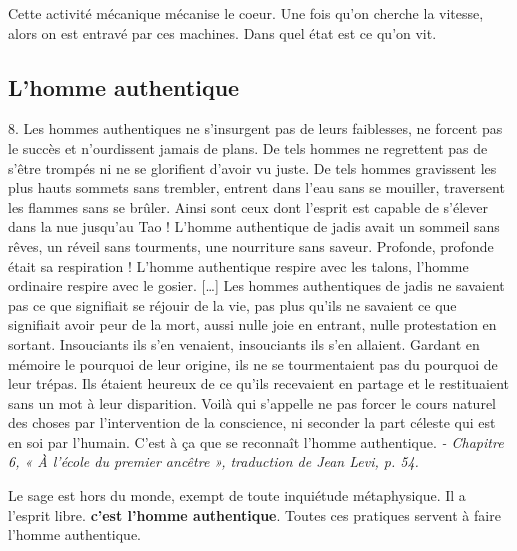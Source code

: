     Cette activité mécanique mécanise le coeur. Une fois qu'on cherche la vitesse, alors on est entravé par ces machines. Dans quel état est ce qu'on vit. 

\subsection{L'homme authentique}
    
  \begin{singlequote}
      8. Les hommes authentiques ne s’insurgent pas de leurs faiblesses, ne forcent pas le succès et  n’ourdissent jamais de plans.          De tels hommes ne regrettent pas de s’être trompés ni ne se glorifient d’avoir vu juste. De tels hommes gravissent les plus hauts sommets sans trembler, entrent dans l’eau sans se mouiller, traversent les flammes sans se brûler. Ainsi sont ceux dont l’esprit est capable de s’élever dans la nue jusqu’au Tao !         L’homme authentique de jadis avait un sommeil sans rêves, un réveil sans tourments, une nourriture sans saveur. Profonde, profonde était sa respiration ! L’homme authentique respire avec les talons, l’homme ordinaire respire avec le gosier. […]         Les hommes authentiques de jadis ne savaient pas ce que signifiait se réjouir de la vie, pas plus qu’ils ne savaient ce que signifiait avoir peur de la mort, aussi nulle joie en entrant, nulle protestation en sortant. Insouciants ils s’en venaient, insouciants ils s’en allaient. Gardant en mémoire le pourquoi de leur origine, ils ne se tourmentaient pas du pourquoi de leur trépas. Ils étaient heureux de ce qu’ils recevaient en partage et le restituaient sans un mot à leur disparition. Voilà qui s’appelle ne pas forcer le cours naturel des choses par l’intervention de la conscience, ni seconder la part céleste qui est en soi par l’humain. C’est à ça que se reconnaît l’homme authentique. 
      \textit{\small - Chapitre 6, « À l’école du premier ancêtre », traduction de Jean Levi, p. 54.  }
  \end{singlequote}
     Le sage est hors du monde, exempt de toute inquiétude métaphysique. Il a l'esprit libre. \textbf{c'est l'homme authentique}.
    Toutes ces pratiques servent à faire l'homme authentique. 

